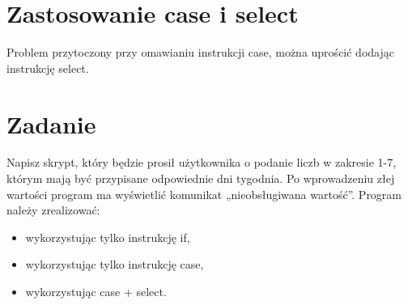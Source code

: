 \section{Zastosowanie case i select}
Problem przytoczony przy omawianiu instrukcji case, można uprościć dodając instrukcję select. \newline


\section{Zadanie}
Napisz skrypt, który będzie prosił użytkownika o podanie liczb w zakresie 1-7, którym mają być przypisane  odpowiednie dni tygodnia. Po wprowadzeniu złej wartości program ma wyświetlić komunikat „nieobsługiwana wartość”. Program należy zrealizować:
\begin{itemize}[itemsep=0cm,leftmargin=1cm]
\item wykorzystując tylko instrukcję if,
\item wykorzystując tylko instrukcję case,
\item wykorzystując case + select.
\end{itemize}
